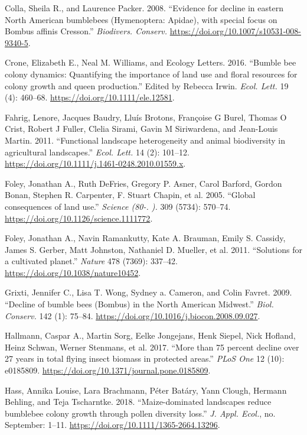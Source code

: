 \documentclass[11pt,]{article}
\begin{document}
\leavevmode\hypertarget{ref-Colla2008}{}%
Colla, Sheila R., and Laurence Packer. 2008. ``Evidence for decline in
eastern North American bumblebees (Hymenoptera: Apidae), with special
focus on Bombus affinis Cresson.'' \emph{Biodivers. Conserv.}
\url{https://doi.org/10.1007/s10531-008-9340-5}.

\leavevmode\hypertarget{ref-Crone2016}{}%
Crone, Elizabeth E., Neal M. Williams, and Ecology Letters. 2016.
``Bumble bee colony dynamics: Quantifying the importance of land use and
floral resources for colony growth and queen production.'' Edited by
Rebecca Irwin. \emph{Ecol. Lett.} 19 (4): 460--68.
\url{https://doi.org/10.1111/ele.12581}.

\leavevmode\hypertarget{ref-Fahrig2011b}{}%
Fahrig, Lenore, Jacques Baudry, Lluís Brotons, Françoise G Burel, Thomas
O Crist, Robert J Fuller, Clelia Sirami, Gavin M Siriwardena, and
Jean-Louis Martin. 2011. ``Functional landscape heterogeneity and animal
biodiversity in agricultural landscapes.'' \emph{Ecol. Lett.} 14 (2):
101--12. \url{https://doi.org/10.1111/j.1461-0248.2010.01559.x}.

\leavevmode\hypertarget{ref-Foley2005a}{}%
Foley, Jonathan A., Ruth DeFries, Gregory P. Asner, Carol Barford,
Gordon Bonan, Stephen R. Carpenter, F. Stuart Chapin, et al. 2005.
``Global consequences of land use.'' \emph{Science (80-. ).} 309 (5734):
570--74. \url{https://doi.org/10.1126/science.1111772}.

\leavevmode\hypertarget{ref-Foley2011b}{}%
Foley, Jonathan A., Navin Ramankutty, Kate A. Brauman, Emily S. Cassidy,
James S. Gerber, Matt Johnston, Nathaniel D. Mueller, et al. 2011.
``Solutions for a cultivated planet.'' \emph{Nature} 478 (7369):
337--42. \url{https://doi.org/10.1038/nature10452}.

\leavevmode\hypertarget{ref-Grixti2009}{}%
Grixti, Jennifer C., Lisa T. Wong, Sydney a. Cameron, and Colin Favret.
2009. ``Decline of bumble bees (Bombus) in the North American Midwest.''
\emph{Biol. Conserv.} 142 (1): 75--84.
\url{https://doi.org/10.1016/j.biocon.2008.09.027}.

\leavevmode\hypertarget{ref-Hallmann2017}{}%
Hallmann, Caspar A., Martin Sorg, Eelke Jongejans, Henk Siepel, Nick
Hofland, Heinz Schwan, Werner Stenmans, et al. 2017. ``More than 75
percent decline over 27 years in total flying insect biomass in
protected areas.'' \emph{PLoS One} 12 (10): e0185809.
\url{https://doi.org/10.1371/journal.pone.0185809}.

\leavevmode\hypertarget{ref-Hass2018a}{}%
Hass, Annika Louise, Lara Brachmann, Péter Batáry, Yann Clough, Hermann
Behling, and Teja Tscharntke. 2018. ``Maize-dominated landscapes reduce
bumblebee colony growth through pollen diversity loss.'' \emph{J. Appl.
Ecol.}, no. September: 1--11.
\url{https://doi.org/10.1111/1365-2664.13296}.
\end{document}

